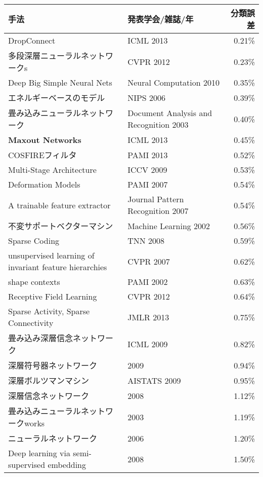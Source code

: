     \begin{tabular}{|l|l|r|}\hline
    手法 & 発表学会/雑誌/年 & 分類誤差 \\ \hline
    DropConnect \cite{wan2013regularization}& ICML 2013 & 0.21\% \\ \hline
    多段深層ニューラルネットワークs \cite{ciresan2012multi-column}& CVPR 2012 & 0.23\% \\ \hline
    Deep Big Simple Neural Nets \cite{ciresan2010deep}& Neural Computation 2010 & 0.35\% \\ \hline
    エネルギーベースのモデル\cite{poultney2006efficient}& NIPS 2006 & 0.39\% \\ \hline
    畳み込みニューラルネットワーク \cite{simard2003best}& Document Analysis and Recognition 2003 & 0.40\% \\ \hline
    \textbf{Maxout Networks} \cite{goodfellow2013maxout}& ICML 2013 & 0.45\% \\ \hline
    COSFIREフィルタ \cite{azzopardi2013trainable}& PAMI 2013 & 0.52\% \\ \hline
    Multi-Stage Architecture \cite{jarrett2009what}& ICCV 2009 & 0.53\% \\ \hline
    Deformation Models \cite{keysers2007deformation}& PAMI 2007 & 0.54\% \\ \hline
    A trainable feature extractor \cite{lauer2007a-trainable}& Journal Pattern Recognition 2007   & 0.54\% \\ \hline
    不変サポートベクターマシン \cite{decoste2002training}& Machine Learning 2002 & 0.56\% \\ \hline
    Sparse Coding \cite{labusch2008simple}& TNN 2008 & 0.59\% \\ \hline
    unsupervised learning of invariant feature hierarchies \cite{ranzato2007unsupervised}& CVPR 2007 & 0.62\% \\ \hline
    shape contexts \cite{belongie2002shape}& PAMI 2002 & 0.63\% \\ \hline
    Receptive Field Learning \cite{jia2012beyond}& CVPR 2012 & 0.64\% \\ \hline
    Sparse Activity, Sparse Connectivity \cite{thom2013sparse}& JMLR 2013 & 0.75\% \\ \hline
    畳み込み深層信念ネットワーク \cite{lee2009convolutional}& ICML 2009 & 0.82\% \\ \hline
    深層符号器ネットワーク \cite{min2009large-margin}& 2009 & 0.94\% \\ \hline
    深層ボルツマンマシン \cite{salakhutdinov2009deep}& AISTATS 2009 & 0.95\% \\ \hline
    深層信念ネットワーク \cite{dahl2008cs81:}& 2008 & 1.12\% \\ \hline
    畳み込みニューラルネットワークworks  \cite{simard2003best}& 2003 & 1.19\% \\ \hline
    ニューラルネットワーク \cite{hinton2006reducing}& 2006 & 1.20\% \\ \hline
    Deep learning via semi-supervised embedding \cite{weston2012deep}& 2008 & 1.50\% \\ \hline
    \end{tabular}%
